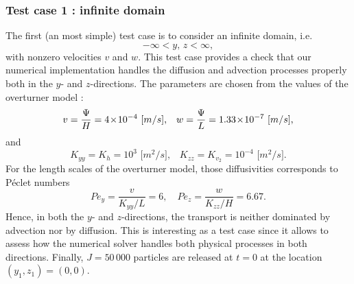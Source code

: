 \subsubsection{Test case 1 : infinite domain}
The first (an most simple) test case is to consider an infinite domain, i.e.
\begin{equation} \label{eq:testcase:domain}
	-\infty < y,\, z < \infty,
\end{equation}
with nonzero velocities $v$ and $w$. This test case provides a check that our numerical implementation handles the diffusion and advection processes properly both in the $y$- and $z$-directions. The parameters are chosen from the values of the overturner model :
\begin{equation}
	v = \frac{\Psi}{H} = 4\!\times\!10^{-4}\mbox{ [$m/s$],}\quad  w = \frac{\Psi}{L}=1.33\!\times\!10^{-7}\mbox{ [$m/s$],}
\end{equation}
and
\begin{equation}
	K_{yy} = K_h = 10^{3} \mbox{ [$m^2/s$],}\quad K_{zz} = K_{v_{2}} = 10^{-4} \mbox{ [$m^2/s$].} 
\end{equation}
For the length scales of the overturner model, those diffusivities corresponds to Péclet numbers
\begin{equation}
	Pe_y = \frac{v}{K_{yy}/L} = 6,\quad Pe_z = \frac{w}{K_{zz}/H} = 6.67.
\end{equation}
Hence, in both the $y$- and $z$-directions, the transport is neither dominated by advection nor by diffusion. This is interesting as a test case since it allows to assess how the numerical solver handles both physical processes in both directions. 
Finally, $J = 50\,000$ particles are released at $t=0$ at the location $(y_1,z_1) = (0,0)$.

